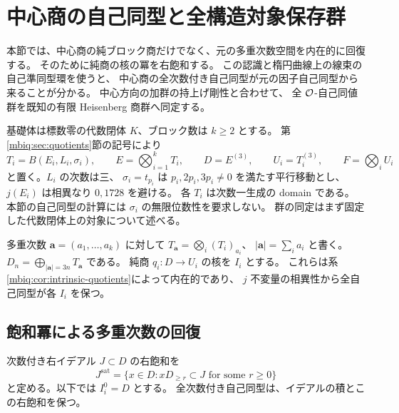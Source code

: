 \section{中心商の自己同型と全構造対象保存群}
\label{mbca:sec:automorphisms}

本節では、中心商の純ブロック商だけでなく、元の多重次数空間を内在的に回復する。
そのために純商の核の冪を右飽和する。
この認識と楕円曲線上の線束の自己準同型環を使うと、
中心商の全次数付き自己同型が元の因子自己同型から来ることが分かる。
中心方向の加群の持上げ剛性と合わせて、
全 $\mathcal O$-自己同値群を既知の有限 Heisenberg 商群へ同定する。

基礎体は標数零の代数閉体 $K$、ブロック数は $k\ge2$ とする。
第\ref{mbiq:sec:quotients}節の記号により
\[
 T_i=B(E_i,L_i,\sigma_i),\qquad
 E=\bigotimes_{i=1}^kT_i,\qquad
 D=E^{(3)},\qquad U_i=T_i^{(3)},\qquad F=\bigotimes_iU_i
\]
と置く。$L_i$ の次数は三、
$\sigma_i=t_{p_i}$ は $p_i,2p_i,3p_i\ne0$ を満たす平行移動とし、
$j(E_i)$ は相異なり $0,1728$ を避ける。
各 $T_i$ は次数一生成の domain である。
本節の自己同型の計算には $\sigma_i$ の無限位数性を要求しない。
群の同定はまず固定した代数閉体上の対象について述べる。

多重次数 $\boldsymbol a=(a_1,\ldots,a_k)$ に対して
$T_{\boldsymbol a}=\bigotimes_i(T_i)_{a_i}$、
$|\boldsymbol a|=\sum_i a_i$ と書く。
$D_n=\bigoplus_{|\boldsymbol a|=3n}T_{\boldsymbol a}$ である。
純商 $q_i:D\to U_i$ の核を $I_i$ とする。
これらは系\ref{mbiq:cor:intrinsic-quotients}によって内在的であり、
$j$ 不変量の相異性から全自己同型が各 $I_i$ を保つ。

\subsection{飽和冪による多重次数の回復}

次数付き右イデアル $J\subset D$ の右飽和を
\[
 J^{\mathrm{sat}}=
 \{x\in D:xD_{\ge r}\subset J\text{ for some }r\ge0\}
\]
と定める。以下では $I_i^0=D$ とする。
全次数付き自己同型は、イデアルの積とこの右飽和を保つ。

